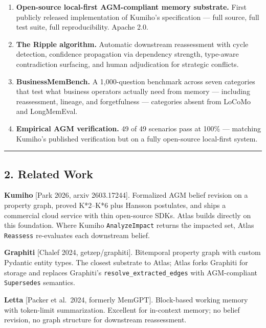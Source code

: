 \documentclass[
  11pt,
]{article}
\providecommand{\tightlist}{%
  \setlength{\itemsep}{0pt}\setlength{\parskip}{0pt}}
\begin{document}
\begin{enumerate}
\def\labelenumi{\arabic{enumi}.}
\tightlist
\item
  \textbf{Open-source local-first AGM-compliant memory substrate.} First
  publicly released implementation of Kumiho's specification --- full
  source, full test suite, full reproducibility. Apache 2.0.
\item
  \textbf{The Ripple algorithm.} Automatic downstream reassessment with
  cycle detection, confidence propagation via dependency strength,
  type-aware contradiction surfacing, and human adjudication for
  strategic conflicts.
\item
  \textbf{BusinessMemBench.} A 1,000-question benchmark across seven
  categories that test what business operators actually need from memory
  --- including reassessment, lineage, and forgetfulness --- categories
  absent from LoCoMo and LongMemEval.
\item
  \textbf{Empirical AGM verification.} 49 of 49 scenarios pass at 100\%
  --- matching Kumiho's published verification but on a fully
  open-source local-first system.
\end{enumerate}

\begin{center}\rule{0.5\linewidth}{0.5pt}\end{center}

\subsection{2. Related Work}\label{related-work}

\textbf{Kumiho} {[}Park 2026, arxiv 2603.17244{]}. Formalized AGM belief
revision on a property graph, proved K*2--K*6 plus Hansson postulates,
and ships a commercial cloud service with thin open-source SDKs. Atlas
builds directly on this foundation. Where Kumiho \texttt{AnalyzeImpact}
returns the impacted set, Atlas \texttt{Reassess} re-evaluates each
downstream belief.

\textbf{Graphiti} {[}Chalef 2024, getzep/graphiti{]}. Bitemporal
property graph with custom Pydantic entity types. The closest substrate
to Atlas; Atlas forks Graphiti for storage and replaces Graphiti's
\texttt{resolve\_extracted\_edges} with AGM-compliant
\texttt{Supersedes} semantics.

\textbf{Letta} {[}Packer et al.~2024, formerly MemGPT{]}. Block-based
working memory with token-limit summarization. Excellent for in-context
memory; no belief revision, no graph structure for downstream
reassessment.
\end{document}
